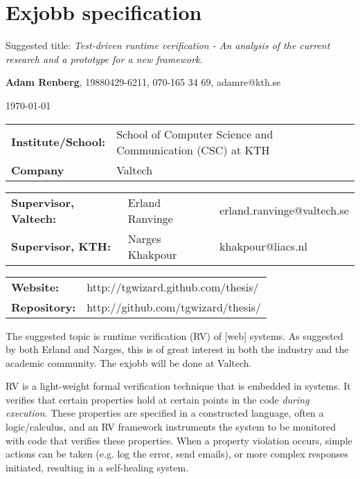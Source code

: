 \documentclass[a4paper,11pt]{kth-mag}
\begin{document}
\removepagenumbers%
\setlength\parindent{0em}
\setlength\parskip{1em}

\pagestyle{empty}


\chapter*{Exjobb specification}

Suggested title: \textit{Test-driven runtime verification - An analysis
of the current research and a prototype for a new framework}.

\textbf{Adam Renberg}, 19880429-6211, 070-165 34 69, adamre@kth.se

\today

\begin{tabular}{lll}
	\textbf{Institute/School:} & School of Computer Science and Communication (CSC) at KTH \\
    \textbf{Company}           & Valtech \\
\end{tabular}

\begin{tabular}{lll}
	\textbf{Supervisor, Valtech:} & Erland Ranvinge & erland.ranvinge@valtech.se \\
    \textbf{Supervisor, KTH:}     & Narges Khakpour & khakpour@liacs.nl \\
\end{tabular}

\begin{tabular}{ll}
    \textbf{Website:} & http://tgwizard.github.com/thesis/ \\
    \textbf{Repository:} & http://github.com/tgwizard/thesis/ \\
\end{tabular}


The suggested topic is runtime verification (RV) of [web] systems. As suggested
by both Erland and Narges, this is of great interest in both the industry and
the academic community. The exjobb will be done at Valtech.

RV is a light-weight formal verification technique that is embedded in systems.
It verifies that certain properties hold at certain points in the code
\textit{during execution}. These properties are specified in a constructed
language, often a logic/calculus, and an RV framework instruments the system to
be monitored with code that verifies these properties. When a property
violation occurs, simple actions can be taken (e.g. log the error, send
emails), or more complex responses initiated, resulting in a self-healing
system.
\end{document}
